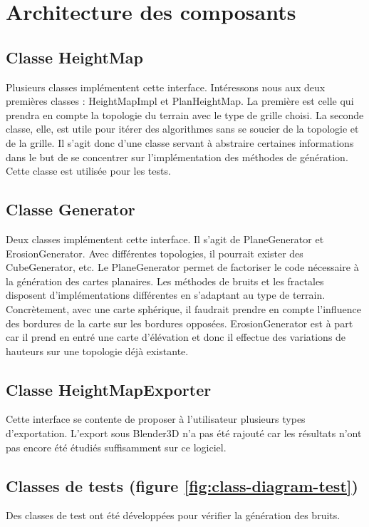 \section{Architecture des composants}

\subsection{Classe HeightMap}
Plusieurs classes implémentent cette interface. Intéressons nous aux deux premières classes : HeightMapImpl et PlanHeightMap.
La première est celle qui prendra en compte la topologie du terrain avec le type de grille choisi.
La seconde classe, elle, est utile pour itérer des algorithmes sans se soucier de la topologie et de la grille.
Il s'agit donc d'une classe servant à abstraire certaines informations dans le but de se concentrer sur 
l'implémentation des méthodes de génération. Cette classe est utilisée pour les tests.

\subsection{Classe Generator}
Deux classes implémentent cette interface. Il s'agit de PlaneGenerator et ErosionGenerator.
Avec différentes topologies, il pourrait exister des CubeGenerator, etc. Le PlaneGenerator permet
de factoriser le code nécessaire à la génération des cartes planaires. Les méthodes de bruits et les fractales
disposent d'implémentations différentes en s'adaptant au type de terrain. Concrètement, avec une carte sphérique, il faudrait 
prendre en compte l'influence des bordures de la carte sur les bordures opposées.
ErosionGenerator est à part car il prend en entré une carte d'élévation et donc il effectue des 
variations de hauteurs sur une topologie déjà existante.

\subsection{Classe HeightMapExporter}
Cette interface se contente de proposer à l'utilisateur plusieurs types d'exportation. 
L'export sous Blender3D n'a pas été rajouté car les résultats n'ont pas encore été étudiés suffisamment sur ce logiciel.

\subsection{Classes de tests (figure \ref{fig:class-diagram-test})}
Des classes de test ont été développées pour vérifier la génération des bruits.

